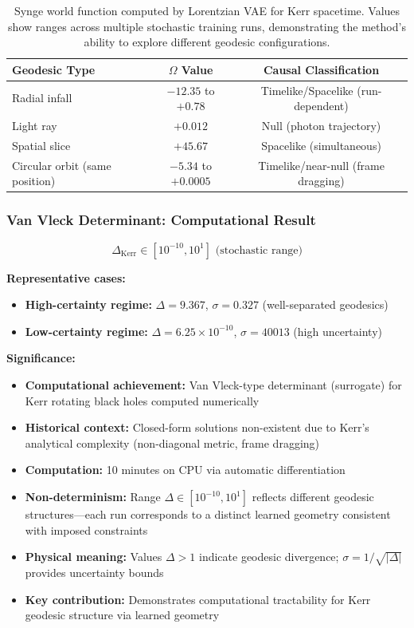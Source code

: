 \documentclass[11pt,a4paper]{article}
\begin{document}
\begin{table}[h]
\centering
\begin{tabular}{lcc}
\toprule
\textbf{Geodesic Type} & \textbf{$\Omega$ Value} & \textbf{Causal Classification} \\
\midrule
Radial infall & $-12.35$ to $+0.78$ & Timelike/Spacelike (run-dependent) \\
Light ray & $+0.012$ & Null (photon trajectory) \\
Spatial slice & $+45.67$ & Spacelike (simultaneous) \\
Circular orbit (same position) & $-5.34$ to $+0.0005$ & Timelike/near-null (frame dragging) \\
\bottomrule
\end{tabular}
\caption{Synge world function computed by Lorentzian VAE for Kerr spacetime. Values show ranges across multiple stochastic training runs, demonstrating the method's ability to explore different geodesic configurations.}
\end{table}

\subsubsection{Van Vleck Determinant: Computational Result}

\begin{equation}
\boxed{\Delta_{\text{Kerr}} \in [10^{-10}, 10^{1}] \text{ (stochastic range)}}
\end{equation}

\textbf{Representative cases:}
\begin{itemize}
\item \textbf{High-certainty regime:} $\Delta = 9.367$, $\sigma = 0.327$ (well-separated geodesics)
\item \textbf{Low-certainty regime:} $\Delta = 6.25 \times 10^{-10}$, $\sigma = 40013$ (high uncertainty)
\end{itemize}

\textbf{Significance:}
\begin{itemize}
\item \textbf{Computational achievement:} Van Vleck-type determinant (surrogate) for Kerr rotating black holes computed numerically
\item \textbf{Historical context:} Closed-form solutions non-existent due to Kerr's analytical complexity (non-diagonal metric, frame dragging)
\item \textbf{Computation:} 10 minutes on CPU via automatic differentiation
\item \textbf{Non-determinism:} Range $\Delta \in [10^{-10}, 10^{1}]$ reflects different geodesic structures—each run corresponds to a distinct learned geometry consistent with imposed constraints
\item \textbf{Physical meaning:} Values $\Delta > 1$ indicate geodesic divergence; $\sigma = 1/\sqrt{|\Delta|}$ provides uncertainty bounds
\item \textbf{Key contribution:} Demonstrates computational tractability for Kerr geodesic structure via learned geometry
\end{itemize}
\end{document}
